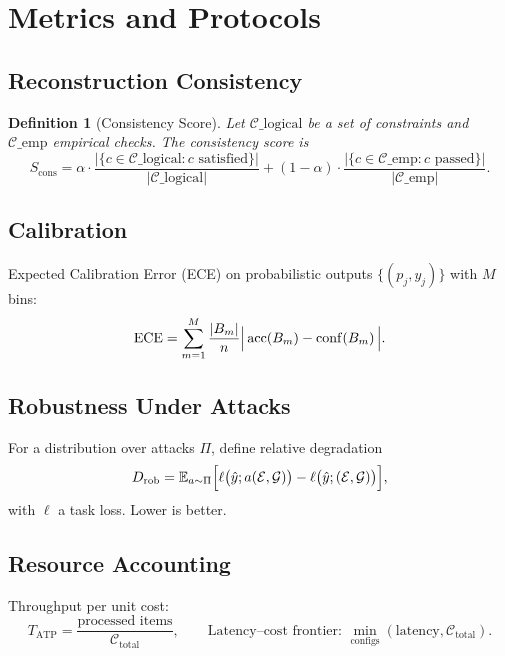 \documentclass[12pt,a4paper]{article}
\newtheorem{definition}{Definition}
\begin{document}
\section{Metrics and Protocols}
\subsection{Reconstruction Consistency}
\begin{definition}[Consistency Score]
Let $\mathcal{C}\_\text{logical}$ be a set of constraints and $\mathcal{C}\_\text{emp}$ empirical checks. The consistency score is
\begin{equation}
 S_{\text{cons}} = \alpha \cdot \frac{|\{c \in \mathcal{C}\_\text{logical} : c\text{ satisfied}\}|}{|\mathcal{C}\_\text{logical}|} + (1-\alpha) \cdot \frac{|\{c \in \mathcal{C}\_\text{emp} : c\text{ passed}\}|}{|\mathcal{C}\_\text{emp}|}.
\end{equation}
\end{definition}

\subsection{Calibration}
Expected Calibration Error (ECE) on probabilistic outputs $\{(p_j, y_j)\}$ with $M$ bins:
\begin{equation}
 \mathrm{ECE} = \sum_{m=1}^{M} \frac{|B_m|}{n} \Bigl|\, \mathrm{acc}(B_m) - \mathrm{conf}(B_m)\,\Bigr|.
\end{equation}

\subsection{Robustness Under Attacks}
For a distribution over attacks $\Pi$, define relative degradation
\begin{equation}
 D_{\text{rob}} = \mathbb{E}_{a\sim \Pi}\Bigl[ \ell\bigl(\hat{y}; a(\mathcal{E},\mathcal{G})\bigr) - \ell\bigl(\hat{y}; (\mathcal{E},\mathcal{G})\bigr) \Bigr],
\end{equation}
with $\ell$ a task loss. Lower is better.

\subsection{Resource Accounting}
Throughput per unit cost:
\begin{equation}
 T_{\text{ATP}} = \frac{\text{processed\ items}}{\mathcal{C}_{\text{total}}}, \qquad \text{Latency--cost frontier: } \min\limits_{\text{configs}} (\text{latency}, \mathcal{C}_{\text{total}}).
\end{equation}
\end{document}
